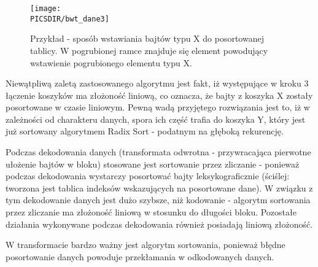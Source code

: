 \begin{figure}
\centering
\texttt{[image: \\PICSDIR/bwt\_dane3]}

\caption{\label{fig:Spos=0000F3b-wstawiania-bajt=0000F3w}Przykład - sposób
wstawiania bajtów typu X do posortowanej tablicy. W pogrubionej ramce
znajduje się element powodujący wstawienie pogrubionego elementu typu
X.}

\end{figure}
Niewątpliwą zaletą zastosowanego algorytmu jest fakt, iż występujące
w kroku 3 łączenie koszyków ma złożoność liniową, co oznacza, że bajty
z koszyka X zostały posortowane w czasie liniowym. Pewną wadą przyjętego
rozwiązania jest to, iż w zależności od charakteru danych, spora ich
część trafia do koszyka Y, który jest już sortowany algorytmem Radix
Sort - podatnym na głęboką rekurencję.

Podczas dekodowania danych (transformata odwrotna - przywracająca
pierwotne ułożenie bajtów w bloku) stosowane jest sortowanie przez
zliczanie - ponieważ podczas dekodowania wystarczy posortować bajty
leksykograficznie (ściślej: tworzona jest tablica indeksów wskazujących
na posortowane dane). W związku z tym dekodowanie danych jest dużo
szybsze, niż kodowanie - algorytm sortowania przez zliczanie ma złożoność
liniową w stosunku do długości bloku. Pozostałe działania wykonywane
podczas dekodowania również posiadają liniową złożoność.

W transformacie bardzo ważny jest algorytm sortowania, ponieważ błędne
posortowanie danych powoduje przekłamania w odkodowanych danych.
